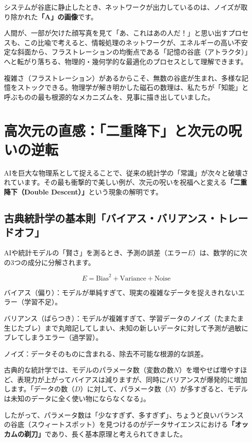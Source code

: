 システムが谷底に静止したとき、ネットワークが出力しているのは、ノイズが取り除かれた\textbf{「A」の画像}です。

人間が、一部が欠けた顔写真を見て「あ、これはあの人だ！」と思い出すプロセスも、この比喩で考えると、情報処理のネットワークが、エネルギーの高い不安定な斜面から、フラストレーションの均衡点である「記憶の谷底（アトラクタ）」へと転がり落ちる、物理的・幾何学的な最適化のプロセスとして理解できます。

複雑さ（フラストレーション）があるからこそ、無数の谷底が生まれ、多様な記憶をストックできる。物理学が解き明かした磁石の数理は、私たちが「知能」と呼ぶものの最も根源的なメカニズムを、見事に描き出していました。

\section{高次元の直感：「二重降下」と次元の呪いの逆転}

AIを巨大な物理系として捉えることで、従来の統計学の「常識」が次々と破壊されています。その最も衝撃的で美しい例が、次元の呪いを祝福へと変える\textbf{「二重降下（Double Descent）」}という現象の解明です。

\subsection{古典統計学の基本則「バイアス・バリアンス・トレードオフ」}

AIや統計モデルの「賢さ」を測るとき、予測の誤差（エラー\(E\)）は、数学的に次の3つの成分に分解されます。

\[E = \text{Bias}^2 + \text{Variance} + \text{Noise}\]

バイアス（偏り）：モデルが単純すぎて、現実の複雑なデータを捉えきれないエラー（学習不足）。

バリアンス（ばらつき）：モデルが複雑すぎて、学習データのノイズ（たまたま生じたブレ）まで丸暗記してしまい、未知の新しいデータに対して予測が過敏にブレてしまうエラー（過学習）。

ノイズ：データそのものに含まれる、除去不可能な根源的な誤差。

古典的な統計学では、モデルのパラメータ数（変数の数\(N\)）を増やせば増やすほど、表現力が上がってバイアスは減りますが、同時にバリアンスが爆発的に増加します。「データの数（\(D\)）に対して、パラメータ数（\(N\)）が多すぎると、モデルは未知のデータに全く使い物にならなくなる」。

したがって、パラメータ数は「少なすぎず、多すぎず」、ちょうど良いバランスの谷底（スウィートスポット）を見つけるのがデータサイエンスにおける\textbf{「オッカムの剃刀」}であり、長く基本原理と考えられてきました。


